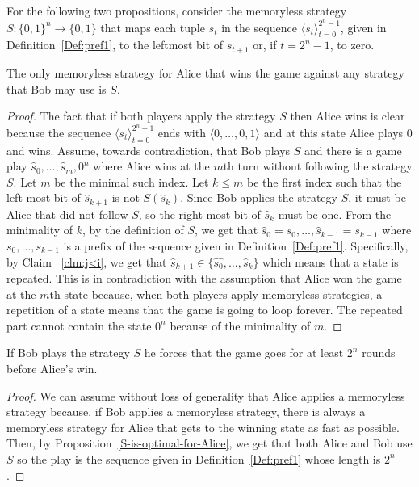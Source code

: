 \documentclass[final,12pt]{elsarticle}
\theoremstyle{definition} \newtheorem{definition}[theorem]{Definition} \newtheorem{observation}[theorem]{Observation} \newtheorem{example}[theorem]{Example} \newtheorem{remark}[theorem]{Remark} \newtheorem{corrolary}[theorem]{Corrolary}
\newcommand{\REF}[2]{#1~\ref{#2}}
\newcommand{\T}[1]{\langle{#1}\rangle} \DeclareMathOperator{\drop}{drop} \DeclareMathOperator{\dropbits}{drop\_bits} \DeclareMathOperator{\dropstates}{drop\_states} \DeclareMathOperator{\leadingForm}{LeadingForm} \DeclareMathOperator{\dv}{div} %
\begin{document}
For the following two propositions, consider the memoryless strategy $S\colon \{0,1\}^n \to \{0,1\}$ that maps each tuple $s_t$ in the sequence $\T{s_t}_{t=0}^{2^n-1}$, given in \REF{Definition}{Def:pref1}, to the leftmost bit of $s_{t+1}$ or, if $t=2^n-1$,  to zero.
\begin{proposition}
	The only memoryless strategy for Alice that wins the game against any strategy that Bob may use is $S$. \label{S-is-optimal-for-Alice}
	\label{prop:opt-bob}
\end{proposition}
\begin{proof}
	The fact that if both players apply the strategy $S$ then Alice wins is clear because the sequence $\T{s_t}_{t=0}^{2^n-1}$ ends with $\T{0,\dots,0,1}$ and at this state Alice plays 0 and wins.
	Assume, towards contradiction, that Bob plays $S$ and there is a game play $\hat{s}_0,\dots, \hat{s}_m,0^n$ where Alice wins at the $m$th turn without following the strategy $S$. Let $m$ be the minimal such index. Let $k \leq m$ be the first index such that the left-most bit of $ \hat{s}_{k+1}$ is not $S( \hat{s}_k)$. Since Bob applies the strategy $S$, it must be Alice that did not follow $S$, so the right-most bit of $ \hat{s}_k$ must be one. From the minimality of $k$, by the definition of $S$, we get that $ \hat{s}_0=s_0,\dots, \hat{s}_{k-1}=s_{k-1}$ where $s_0,\dots,s_{k-1}$ is a prefix of the sequence given in \REF{Definition}{Def:pref1}. Specifically, by Claim~   \ref{clm:j<i}, we get that $ \hat{s}_{k+1} \in \{ \hat{s_0},\dots,  \hat{s}_k\}$ which means that a state is repeated. This is in contradiction with the assumption that Alice won the game at the $m$th state because, when both players apply memoryless strategies, a repetition of a state means that the game is going to loop forever. The repeated part cannot contain the state $0^n$ because of the minimality of $m$.
\end{proof}

\begin{proposition}
	If Bob plays the strategy $S$ he forces that the game goes for at least $2^n$ rounds before Alice's win.
	\label{prop:opt-alice}
\end{proposition}
\begin{proof}
	We can assume without loss of generality that Alice applies a memoryless strategy because, if Bob applies a memoryless strategy, there is always a memoryless strategy for Alice that gets to the winning state as fast as possible. Then, by \REF{Proposition}{S-is-optimal-for-Alice}, we get that both Alice and Bob use $S$ so the play is the sequence given in \REF{Definition}{Def:pref1} whose length is $2^n$.
\end{proof}
\end{document}
